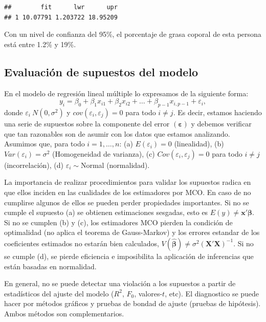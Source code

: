 \documentclass[
]{article}
\begin{document}
\begin{verbatim}
##        fit      lwr      upr
## 1 10.07791 1.203722 18.95209
\end{verbatim}

Con un nivel de confianza del 95\%, el porcentaje de grasa coporal de esta persona está entre 1.2\% y 19\%.

\subsection{Evaluación de supuestos del modelo}\label{evaluaciuxf3n-de-supuestos-del-modelo}

En el modelo de regresión lineal múltiple lo expresamos de la siguiente forma:
\[
y_{i}=\beta_{0} + \beta_{1} x_{i1}+\beta_{2} x_{i2}+\ldots + \beta_{p-1} x_{i,p-1} +\varepsilon_{i},
\]
donde \(\varepsilon_i ~ N(0,\sigma^2)\) y \(cov(\varepsilon_i, \varepsilon_j)=0\) para todo \(i \neq j\). Es decir, estamos haciendo una serie de supuestos sobre la componente del error \((\boldsymbol \varepsilon)\) y debemos verificar que tan razonables son de asumir con los datos que estamos analizando. Asumimos que, para todo \(i=1,\ldots,n\):
(a) \(E(\varepsilon_{i})=0\) (linealidad),
(b) \(Var(\varepsilon_{i})=\sigma^{2}\) (Homogeneidad de varianza),
(c) \(Cov(\varepsilon_{i},\varepsilon_{j})=0\) para todo \(i\neq j\) (incorrelación),
(d) \(\varepsilon_{i} \sim\)Normal (normalidad).

La importancia de realizar procedimientos para validar los supuestos radica en que ellos inciden en las cualidades de los estimadores por MCO. En caso de no cumplirse algunos de ellos se pueden perder propiedades importantes. Si no se cumple el supuesto (a) se obtienen estimaciones sesgadas, esto es \(E(y) \neq \boldsymbol x'\boldsymbol \beta\). Si no se cumplen (b) y (c), los estimadores MCO pierden la condición de optimalidad (no aplica el teorema de Gauss-Markov) y los errores estandar de los coeficientes estimados no estarán bien calculados, \(V(\widehat{\boldsymbol \beta}) \neq \sigma^2(\boldsymbol X'\boldsymbol X)^{-1}\). Si no se cumple (d), se pierde eficiencia e imposibilita la aplicación de inferencias que están basadas en normalidad.

En general, no se puede detectar una violación a los supuestos a partir de estadísticos del ajuste del modelo (\(R^2\), \(F_0\), valores-\(t\), etc). El diagnostico se puede hacer por métodos gráficos y pruebas de bondad de ajuste (pruebas de hipótesis). Ambos métodos son complementarios.
\end{document}
